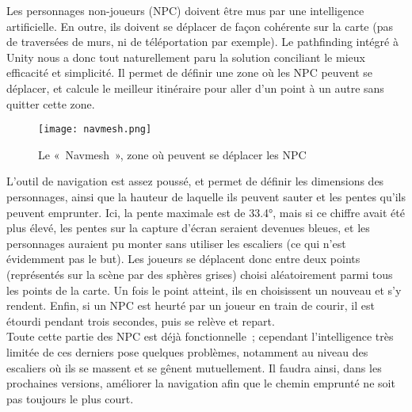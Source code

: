 Les personnages non-joueurs (NPC) doivent être mus par une intelligence artificielle. 
En outre, ils doivent se déplacer de façon cohérente sur la carte (pas de traversées 
de murs, ni de téléportation par exemple). Le pathfinding intégré à Unity nous a 
donc tout naturellement paru la solution conciliant le mieux efficacité et 
simplicité. Il permet de définir une zone où les NPC peuvent se déplacer, et 
calcule le meilleur itinéraire pour aller d’un point à un autre sans quitter cette zone.


\begin{figure}[hbt!]
    \centering
    \texttt{[image: navmesh.png]}
    \caption{Le « Navmesh », zone où peuvent se déplacer les NPC}
\end{figure}

L’outil de navigation est assez poussé, et permet de définir les dimensions des 
personnages, ainsi que la hauteur de laquelle ils peuvent sauter et les pentes 
qu’ils peuvent emprunter. Ici, la pente maximale est de 33.4°, mais si ce chiffre 
avait été plus élevé, les pentes sur la capture d’écran seraient devenues bleues, 
et les personnages auraient pu monter sans utiliser les escaliers (ce qui n’est 
évidemment pas le but).
Les joueurs se déplacent donc entre deux points (représentés sur la scène par des 
sphères grises) choisi aléatoirement parmi tous les points de la carte. Un fois 
le point atteint, ils en choisissent un nouveau et s’y rendent. Enfin, si un NPC 
est heurté par un joueur en train de courir, il est étourdi pendant trois secondes, 
puis se relève et repart. \\
Toute cette partie des NPC est déjà fonctionnelle ; cependant l’intelligence très 
limitée de ces derniers pose quelques problèmes, notamment au niveau des escaliers 
où ils se massent et se gênent mutuellement. Il faudra ainsi, dans les prochaines 
versions, améliorer la navigation afin que le chemin emprunté ne soit pas toujours 
le plus court. 

